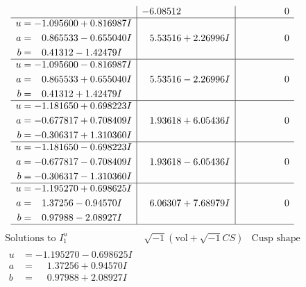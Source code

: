 \documentclass[1p]{elsarticle_modified}
\theoremstyle{definition}
\newcommand{\I}{\sqrt{-1}}
\begin{document}
$$\begin{array}{c|c|c}
 & -6.08512\phantom{ +0.000000I} & \phantom{-0.000000 } 0 \\ \hline\begin{aligned}
u &= -1.095600 + 0.816987 I \\
a &= \phantom{-}0.865533 - 0.655040 I \\
b &= \phantom{-}0.41312 - 1.42479 I\end{aligned}
 & \phantom{-}5.53516 + 2.26996 I & \phantom{-0.000000 } 0 \\ \hline\begin{aligned}
u &= -1.095600 - 0.816987 I \\
a &= \phantom{-}0.865533 + 0.655040 I \\
b &= \phantom{-}0.41312 + 1.42479 I\end{aligned}
 & \phantom{-}5.53516 - 2.26996 I & \phantom{-0.000000 } 0 \\ \hline\begin{aligned}
u &= -1.181650 + 0.698223 I \\
a &= -0.677817 + 0.708409 I \\
b &= -0.306317 + 1.310360 I\end{aligned}
 & \phantom{-}1.93618 + 6.05436 I & \phantom{-0.000000 } 0 \\ \hline\begin{aligned}
u &= -1.181650 - 0.698223 I \\
a &= -0.677817 - 0.708409 I \\
b &= -0.306317 - 1.310360 I\end{aligned}
 & \phantom{-}1.93618 - 6.05436 I & \phantom{-0.000000 } 0 \\ \hline\begin{aligned}
u &= -1.195270 + 0.698625 I \\
a &= \phantom{-}1.37256 - 0.94570 I \\
b &= \phantom{-}0.97988 - 2.08927 I\end{aligned}
 & \phantom{-}6.06307 + 7.68979 I & \phantom{-0.000000 } 0\\
 \hline 
 \end{array}$$\newpage$$\begin{array}{c|c|c}  
\text{Solutions to }I^u_{1}& \I (\text{vol} + \sqrt{-1}CS) & \text{Cusp shape}\\
 \hline 
\begin{aligned}
u &= -1.195270 - 0.698625 I \\
a &= \phantom{-}1.37256 + 0.94570 I \\
b &= \phantom{-}0.97988 + 2.08927 I\end{aligned}

\end{array}$$
\end{document}
